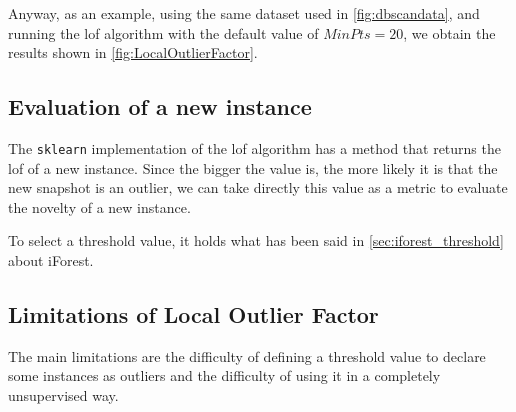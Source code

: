 Anyway, as an example, using the same dataset used in \autoref{fig:dbscandata}, and running the \gls{lof} algorithm with the default value of $MinPts=20$, we obtain the results shown in \autoref{fig:LocalOutlierFactor}.

\subsection{Evaluation of a new instance}
\label{sec:lof_eval}
The \texttt{sklearn} implementation of the \gls{lof} algorithm has a method that returns the \gls{lof} of a new instance. Since the bigger the value is, the more likely it is that the new snapshot is an outlier, we can take directly this value as a metric to evaluate the novelty of a new instance.

To select a threshold value, it holds what has been said in \autoref{sec:iforest_threshold} about iForest.


\subsection{Limitations of Local Outlier Factor}
\label{sec:lof_limitations}
The main limitations are the difficulty of defining a threshold value to declare some instances as outliers and the difficulty of using it in a completely unsupervised way.


